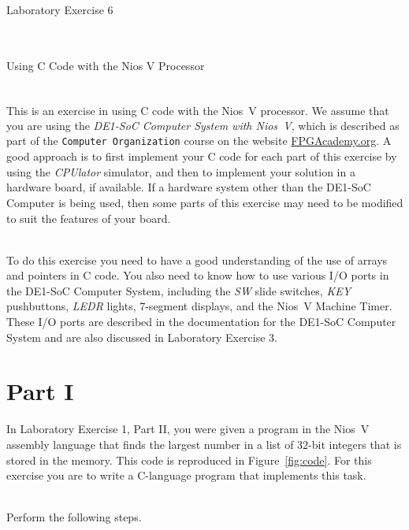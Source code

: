 \documentclass[epsfig,10pt,fullpage]{article}
\begin{document}
~\\
\centerline{\huge Laboratory Exercise 6}
~\\
\centerline{\large Using C Code with the Nios\textsuperscript{\textregistered} V Processor}
~\\

This is an exercise in using C code with the Nios\textsuperscript{\textregistered}~V processor.
We assume that you are using the {\it DE1-SoC Computer System with Nios~V},
which is described as part of the \texttt{Computer Organization} course on the website
{\href{https://www.fpgacademy.org/courses.html} {FPGAcademy.org}}.
A good approach is to first implement your C code for each part of this exercise by 
using the {\it CPUlator} simulator, and then to implement your solution in a hardware board,
if available.  If a hardware system other than the DE1-SoC Computer is being used, then 
some parts of this exercise may need to be modified to suit the features of your board. 

~\\
To do this exercise you need to have a good understanding of the use of arrays and 
pointers in C code. You also need to know how to use various I/O ports in the
DE1-SoC Computer System, including the {\it SW} slide switches, {\it KEY} pushbuttons,
{\it LEDR} lights, 7-segment displays, and the Nios~V Machine Timer. 
These I/O ports are described in the documentation for the 
DE1-SoC Computer System and are also discussed in Laboratory Exercise 3.

\section*{Part I}
In Laboratory Exercise 1, Part II, you were given a program in the Nios~V assembly language 
that finds the largest number in a list of 32-bit integers that is stored in the memory. 
This code is reproduced in Figure~\ref{fig:code}. For this exercise you are to write a 
C-language program that implements this task.

~\\
Perform the following steps.
\end{document}
